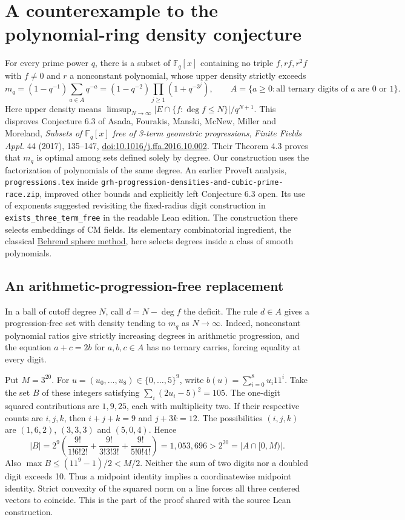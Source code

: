 \section{A counterexample to the polynomial-ring density conjecture}
\label{sec:density}
For every prime power $q$, there is a subset of $\mathbb F_q[x]$ containing
no triple $f,rf,r^2 f$ with $f\ne0$ and $r$ a nonconstant polynomial, whose
upper density strictly exceeds
\[
 m_q=(1-q^{-1})\sum_{a\in A}q^{-a}
     =(1-q^{-2})\prod_{j\ge1}(1+q^{-3^j}),
 \qquad A=\{a\ge0:\text{all ternary digits of }a\text{ are }0\text{ or }1\}.
\]
Here upper density means $\limsup_{N\to\infty}|E\cap\{f:\deg f\le N\}|/q^{N+1}$.
This disproves Conjecture 6.3 of Asada, Fourakis, Manski, McNew, Miller and
Moreland, \emph{Subsets of $\mathbb F_q[x]$ free of 3-term geometric progressions},
\emph{Finite Fields Appl.} 44 (2017), 135--147,
\href{https://doi.org/10.1016/j.ffa.2016.10.002}{doi:10.1016/j.ffa.2016.10.002}.
Their Theorem 4.3 proves that $m_q$ is optimal among sets defined solely by degree.
Our construction uses the factorization of polynomials of the same degree.
An earlier ProveIt analysis, \texttt{progressions.tex} inside
\texttt{grh-progression-densities-and-cubic-prime-race.zip}, improved other bounds
and explicitly left Conjecture 6.3 open. Its use of exponents suggested revisiting
the fixed-radius digit construction in \texttt{exists\_three\_term\_free}
in the readable Lean edition. The construction there selects embeddings of CM fields.
Its elementary combinatorial ingredient, the classical \href{https://doi.org/10.1073/pnas.32.12.331}{Behrend sphere method},
here selects degrees inside a class of smooth polynomials.

\subsection*{An arithmetic-progression-free replacement}
In a ball of cutoff degree $N$, call $d=N-\deg f$ the deficit.
The rule $d\in A$ gives a progression-free set with density tending to $m_q$ as
$N\to\infty$. Indeed, nonconstant polynomial ratios give strictly increasing
degrees in arithmetic progression, and the equation $a+c=2b$ for $a,b,c\in A$
has no ternary carries, forcing equality at every digit.

Put $M=3^{20}$. For $u=(u_0,\ldots,u_8)\in\{0,\ldots,5\}^9$, write
$b(u)=\sum_{i=0}^8u_i11^i$. Take the set $B$ of these integers satisfying
$\sum_i(2u_i-5)^2=105$. The one-digit squared contributions are $1,9,25$,
each with multiplicity two. If their respective counts are $i,j,k$, then
$i+j+k=9$ and $j+3k=12$. The possibilities $(i,j,k)$ are $(1,6,2)$,
$(3,3,3)$ and $(5,0,4)$. Hence
\[
 |B|=2^9\!\left(\frac{9!}{1!6!2!}+\frac{9!}{3!3!3!}
                       +\frac{9!}{5!0!4!}\right)
     =1{,}053{,}696 > 2^{20}=|A\cap[0,M)|.
\]
Also $\max B\le(11^9-1)/2<M/2$. Neither the sum of two digits nor a
doubled digit exceeds 10. Thus a midpoint identity implies a
coordinatewise midpoint identity. Strict convexity of the squared norm
on a line forces all three centered vectors to coincide. This is the
part of the proof shared with the source Lean construction.

